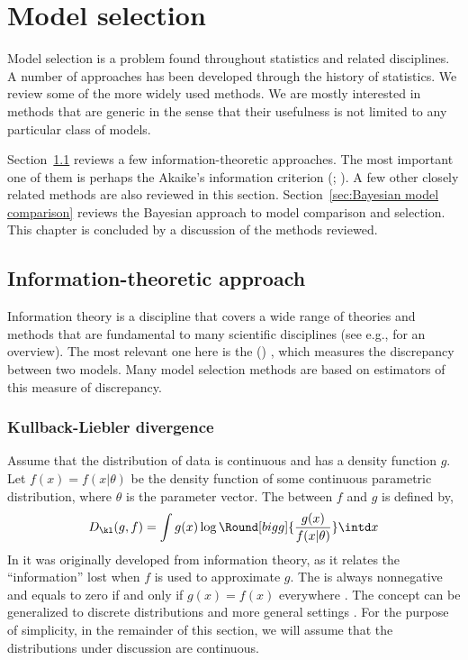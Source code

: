 \chapter{Model selection}
\label{cha:Model selection}

Model selection is a problem found throughout statistics and related
disciplines. A number of approaches has been developed through the history of
statistics. We review some of the more widely used methods. We are mostly
interested in methods that are generic in the sense that their usefulness is
not limited to any particular class of models.

Section~\ref{sec:Information theoretic approach} reviews a few
information-theoretic approaches. The most important one of them is perhaps
the Akaike's information criterion (\aic; \cite{Akaike:1973uc,Akaike:1974ih}).
A few other closely related methods are also reviewed in this section.
Section~\ref{sec:Bayesian model comparison} reviews the Bayesian approach to
model comparison and selection. This chapter is concluded by a discussion of
the methods reviewed.

\section{Information-theoretic approach}
\label{sec:Information theoretic approach}

Information theory is a discipline that covers a wide range of theories and
methods that are fundamental to many scientific disciplines (see e.g.,
\cite{Cover:1991vx} for an overview). The most relevant one here is the
\kldfull (\kld) \cite{Kullback:1951va}, which measures the discrepancy
between two models. Many model selection methods are based on estimators of
this measure of discrepancy.

\subsection{Kullback-Liebler divergence}
\label{sub:Kullback-Liebler divergence}

Assume that the distribution of data is continuous and has a density function
$g$. Let $f(x) = f(x|\theta)$ be the density function of some continuous
parametric distribution, where $\theta$ is the parameter vector. The \kld
between $f$ and $g$ is defined by,
\begin{equation}
  D_{\kl}(g,f) = \int g(x)\log\Round[bigg]{\frac{g(x)}{f(x|\theta)}}\intd x
  \label{eq:kl}
\end{equation}
In \cite{Kullback:1951va} it was originally developed from information
theory, as it relates the ``information'' lost when $f$ is used to
approximate $g$. The \kld is always nonnegative and equals to zero if and
only if $g(x) = f(x)$ everywhere \cite[][sec.~6.8]{Burnham:2002wc}. The
concept can be generalized to discrete distributions and more general
settings \cite[][sec.~2.1.3]{Burnham:2002wc}. For the purpose of simplicity,
in the remainder of this section, we will assume that the distributions under
discussion are continuous.

